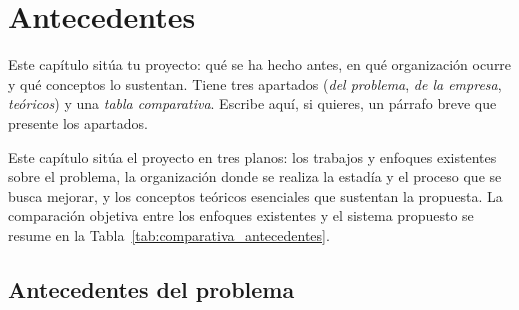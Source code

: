 
\section{Antecedentes} \label{sec:antecedentes}

\begin{guia}
Este capítulo sitúa tu proyecto: qué se ha hecho antes, en qué organización ocurre y qué conceptos lo sustentan.
Tiene tres apartados (\emph{del problema}, \emph{de la empresa}, \emph{teóricos}) y una \emph{tabla comparativa}.
Escribe aquí, si quieres, un párrafo breve que presente los apartados.
\end{guia}

Este capítulo sitúa el proyecto en tres planos: los trabajos y enfoques existentes sobre el problema, la organización donde se realiza la estadía y el proceso que se busca mejorar, y los conceptos teóricos esenciales que sustentan la propuesta. La comparación objetiva entre los enfoques existentes y el sistema propuesto se resume en la Tabla~\ref{tab:comparativa_antecedentes}.

\subsection{Antecedentes del problema} \label{sec:antecedentes_problema} %

